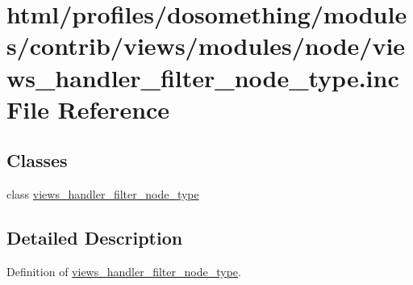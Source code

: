\hypertarget{views__handler__filter__node__type_8inc}{
\section{html/profiles/dosomething/modules/contrib/views/modules/node/views\_\-handler\_\-filter\_\-node\_\-type.inc File Reference}
\label{views__handler__filter__node__type_8inc}
}
\subsection*{Classes}
\begin{DoxyCompactItemize}
\item 
class \hyperlink{classviews__handler__filter__node__type}{views\_\-handler\_\-filter\_\-node\_\-type}
\end{DoxyCompactItemize}


\subsection{Detailed Description}
Definition of \hyperlink{classviews__handler__filter__node__type}{views\_\-handler\_\-filter\_\-node\_\-type}. 